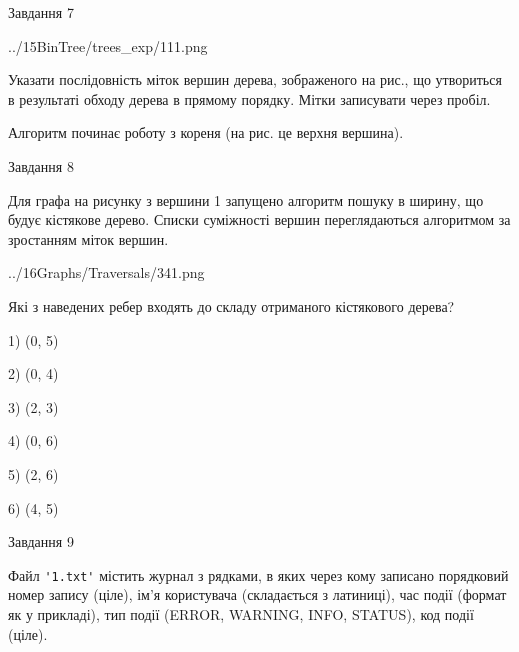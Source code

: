 \documentclass[12pt, ukrainian]{article}
\def\code#1{\Verb!#1!}
\begin{document}
{\vspace{10mm}\par

\newpage
\begin{minipage}[t]{9.7cm}
               
{\begin{center}Завдання {7}\end{center}}
\vspace{-4mm}

\begin{center}
	{../15BinTree/trees_exp/111.png}
\end{center}
Указати послідовність міток вершин дерева, зображеного на рис., що утвориться в результаті обходу дерева в прямому порядку. Мітки записувати через пробіл.\par Алгоритм починає роботу з кореня (на рис. це верхня вершина).\par

\end{minipage}
\vline \hspace{8mm}
\begin{minipage}[t]{8.0cm}
               
{\begin{center}Завдання {8}\end{center}}
\vspace{-4mm}
Для графа на рисунку з вершини 1 запущено алгоритм пошуку в ширину, що будує кістякове дерево. Списки суміжності вершин переглядаються алгоритмом за зростанням міток вершин.\par
\begin{center}
	{../16Graphs/Traversals/341.png}
\end{center}
\par Які з наведених ребер входять до складу отриманого кістякового дерева?\par
1) (0, 5)\par
2) (0, 4)\par
3) (2, 3)\par
4) (0, 6)\par
5) (2, 6)\par
6) (4, 5)\par
{\vskip 15pt} \par

\end{minipage}

               
{\begin{center}Завдання {9}\end{center}}
\vspace{-4mm}
Файл \code{'1.txt'} містить журнал з рядками, в яких через кому записано поряд\-ко\-вий номер запису (ціле), ім'я користувача (складається з латиниці), час події (фор\-мат як у прикладі), тип події (ERROR, WARNING, INFO, STATUS), код події (ціле).

}
\end{document}
